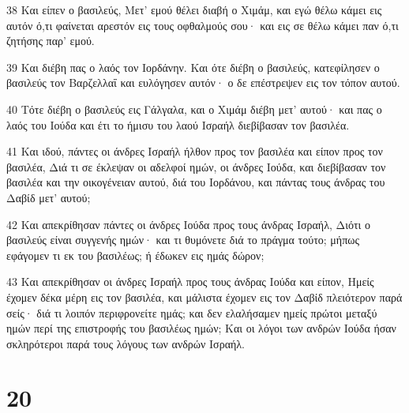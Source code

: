 \par 38 Και είπεν ο βασιλεύς, Μετ' εμού θέλει διαβή ο Χιμάμ, και εγώ θέλω κάμει εις αυτόν ό,τι φαίνεται αρεστόν εις τους οφθαλμούς σου· και εις σε θέλω κάμει παν ό,τι ζητήσης παρ' εμού.
\par 39 Και διέβη πας ο λαός τον Ιορδάνην. Και ότε διέβη ο βασιλεύς, κατεφίλησεν ο βασιλεύς τον Βαρζελλαΐ και ευλόγησεν αυτόν· ο δε επέστρεψεν εις τον τόπον αυτού.
\par 40 Τότε διέβη ο βασιλεύς εις Γάλγαλα, και ο Χιμάμ διέβη μετ' αυτού· και πας ο λαός του Ιούδα και έτι το ήμισυ του λαού Ισραήλ διεβίβασαν τον βασιλέα.
\par 41 Και ιδού, πάντες οι άνδρες Ισραήλ ήλθον προς τον βασιλέα και είπον προς τον βασιλέα, Διά τι σε έκλεψαν οι αδελφοί ημών, οι άνδρες Ιούδα, και διεβίβασαν τον βασιλέα και την οικογένειαν αυτού, διά του Ιορδάνου, και πάντας τους άνδρας του Δαβίδ μετ' αυτού;
\par 42 Και απεκρίθησαν πάντες οι άνδρες Ιούδα προς τους άνδρας Ισραήλ, Διότι ο βασιλεύς είναι συγγενής ημών· και τι θυμόνετε διά το πράγμα τούτο; μήπως εφάγομεν τι εκ του βασιλέως; ή έδωκεν εις ημάς δώρον;
\par 43 Και απεκρίθησαν οι άνδρες Ισραήλ προς τους άνδρας Ιούδα και είπον, Ημείς έχομεν δέκα μέρη εις τον βασιλέα, και μάλιστα έχομεν εις τον Δαβίδ πλειότερον παρά σείς· διά τι λοιπόν περιφρονείτε ημάς; και δεν ελαλήσαμεν ημείς πρώτοι μεταξύ ημών περί της επιστροφής του βασιλέως ημών; Και οι λόγοι των ανδρών Ιούδα ήσαν σκληρότεροι παρά τους λόγους των ανδρών Ισραήλ.

\chapter{20}

